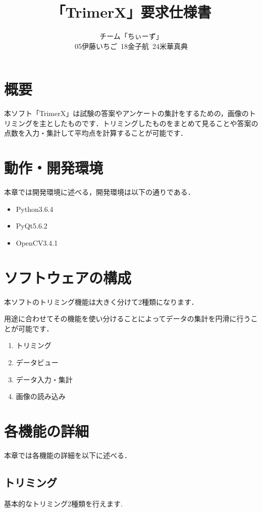 \documentclass[12pt]{jsreport}
\title{「TrimerX」要求仕様書}
\author{チーム「ちぃーず」\\05伊藤いちご\ 18金子航\ 24米華真典}
\date{}
\begin{document}
\maketitle
\newpage

\tableofcontents

\newpage

\setcounter{page}{1}

\section{概要}
本ソフト「TrimerX」は試験の答案やアンケートの集計をするための，画像のトリミングを主としたものです．トリミングしたものをまとめて見ることや答案の点数を入力・集計して平均点を計算することが可能です．

\newpage

\section{動作・開発環境}
本章では開発環境に述べる，開発環境は以下の通りである．
\begin{itemize}
    \item Python3.6.4
    \item PyQt5.6.2
    \item OpenCV3.4.1
\end{itemize}

\newpage


\section{ソフトウェアの構成}
本ソフトのトリミング機能は大きく分けて2種類になります．

用途に合わせてその機能を使い分けることによってデータの集計を円滑に行うことが可能です．
\begin{enumerate}
    \item トリミング
    \item データビュー
    \item データ入力・集計
    \item 画像の読み込み
\end{enumerate}

\newpage

\section{各機能の詳細}
本章では各機能の詳細を以下に述べる．

\subsection{トリミング}
基本的なトリミング2種類を行えます.
\end{document}
